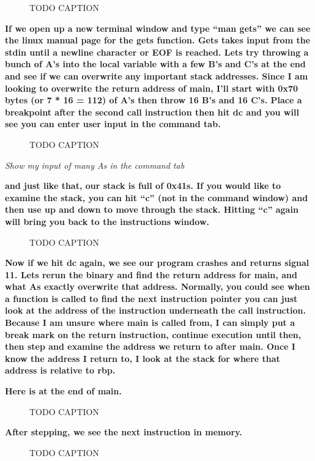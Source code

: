 \documentclass[letterpaper]{article}
\newcommand{\sitfig}[3]{
\begin{figure}[H]
\centering
\makebox[\textwidth][c]{
#2
}
\caption{#3}
\label{#1}
\end{figure}
}
\newcommand{\sitgfx}[4][scale=1.0]{
\sitfig{#3}{\texttt{[image: \#2]}}{#4}
}
\begin{document}
  
\sitgfx[width=5.8335in,height=2.9654in]{FINALWORKINGDOCFORMERLYPRECURSOR-img091.png}{fig:unk}{TODO CAPTION}
 

\textbf{If we open up a new terminal window and type ``man gets'' we can see the linux manual page for the gets
function. Gets takes input from the stdin until a newline character or EOF is reached. Lets try throwing a bunch of A's
into the local variable with a few B's and C's at the end and see if we can overwrite any important stack addresses.
Since I am looking to overwrite the return address of main, I'll start with 0x70 bytes (or 7 * 16 = 112) of A's then
throw 16 B's and 16 C's. Place a breakpoint after the second call instruction then hit dc and you will see you can
enter user input in the command tab.}

  
\sitgfx[width=5.8335in,height=3.6457in]{FINALWORKINGDOCFORMERLYPRECURSOR-img092.png}{fig:unk}{TODO CAPTION}
 

\textit{Show my input of many As in the command tab}

\textbf{and just like that, our stack is full of 0x41s. If you would like to examine the stack, you can hit ``c'' (not
in the command window) and then use up and down to move through the stack. Hitting ``c'' again will bring you back to
the instructions window.}

  
\sitgfx[width=5.8335in,height=3.6457in]{FINALWORKINGDOCFORMERLYPRECURSOR-img093.png}{fig:unk}{TODO CAPTION}
 

\textbf{Now if we hit dc again, we see our program crashes and returns signal 11. Lets rerun the binary and find the
return address for main, and what As exactly overwrite that address. Normally, you could see when a function is called
to find the next instruction pointer you can just look at the address of the instruction underneath the call
instruction. Because I am unsure where main is called from, I can simply put a break mark on the return instruction,
continue execution until then, then step and examine the address we return to after main. Once I know the address I
return to, I look at the stack for where that address is relative to rbp.}

\textbf{Here is at the end of main.}\newline
  
\sitgfx[width=5.8335in,height=3.6457in]{FINALWORKINGDOCFORMERLYPRECURSOR-img094.png}{fig:unk}{TODO CAPTION}
 

\textbf{After stepping, we see the next instruction in memory.\newline
}  
\sitgfx[width=5.8335in,height=3.6457in]{FINALWORKINGDOCFORMERLYPRECURSOR-img095.png}{fig:unk}{TODO CAPTION}
 
\end{document}
